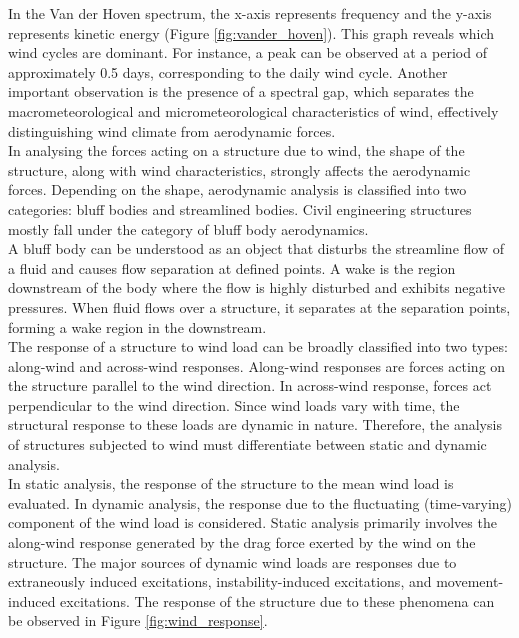 \documentclass[../main]{subfiles}
\begin{document}
In the Van der Hoven spectrum, the x-axis represents frequency and the y-axis represents kinetic energy (Figure \ref{fig:vander_hoven}). This graph reveals which 
wind cycles are dominant. For instance, a peak can be observed at a period of approximately 0.5 days, corresponding to 
the daily wind cycle. Another important observation is the presence of a spectral gap, which separates the macrometeorological and micrometeorological characteristics of wind, effectively distinguishing wind climate 
from aerodynamic forces. \\

In analysing the forces acting on a structure due to wind, the shape of the structure, along with wind characteristics, 
strongly affects the aerodynamic forces. Depending on the shape, aerodynamic analysis is classified into two categories: 
bluff bodies and streamlined bodies. Civil engineering structures mostly fall under the category of bluff body aerodynamics. \\

A bluff body can be understood as an object that disturbs the streamline flow of a fluid and causes flow separation at 
defined points. A wake is the region downstream of the body where the flow is highly disturbed and exhibits negative 
pressures. When fluid flows over a structure, it separates at the separation points, forming a wake region in the downstream. \\

The response of a structure to wind load can be broadly classified into two types: along-wind and across-wind responses. 
Along-wind responses are forces acting on the structure parallel to the wind direction. In across-wind response, 
forces act perpendicular to the wind direction. Since wind loads vary with time, the structural response to these loads 
are dynamic in nature. Therefore, the analysis of structures subjected to wind must differentiate between static and dynamic 
analysis. \\

In static analysis, the response of the structure to the mean wind load is evaluated. In dynamic analysis, the response 
due to the fluctuating (time-varying) component of the wind load is considered. Static analysis primarily involves the 
along-wind response generated by the drag force exerted by the wind on the structure. The major sources of dynamic wind 
loads are responses due to extraneously induced excitations, instability-induced excitations, and movement-induced excitations. 
The response of the structure due to these phenomena can be observed in Figure \ref{fig:wind_response}. \\
\end{document}
